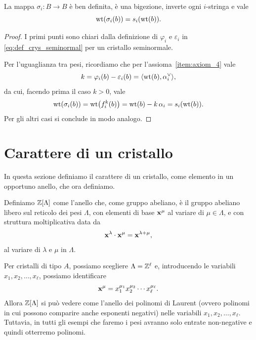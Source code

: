 \begin{proposition}
    \label{prop:sigma_involuzione}
    La mappa $\sigma_i \colon B \to B$ \`e ben definita, \`e una bigezione, inverte
    ogni $i$-stringa e vale 
    \[
        \operatorname{wt}(\sigma_i(b)) = s_i (\operatorname{wt}(b)).
    \]
\end{proposition}

\begin{proof}
    I primi punti sono chiari dalla definizione di $\varphi_i$ e $\varepsilon_i$
    in \eqref{eq:def_crys_seminormal} per un cristallo seminormale.

    Per l'uguaglianza tra pesi, ricordiamo che per l'assioma~\ref{item:axiom_4}
    vale
    \[
        k =  \varphi_i(b) - \varepsilon_i(b) = \langle \operatorname{wt}(b) , \alpha_i^\vee \rangle,
    \]
    da cui, facendo prima il caso $k>0$, vale
    \[
        \operatorname{wt}(\sigma_i(b)) 
        = \operatorname{wt}\bigl(f_i^k (b)\bigr)
        = \operatorname{wt}(b) - k \, \alpha_i
        = s_i(\operatorname{wt}(b)).
    \]
    Per gli altri casi si conclude in modo analogo.
\end{proof}

\section{Carattere di un cristallo}

In questa sezione definiamo il carattere di un cristallo, come elemento in un opportuno
anello, che ora definiamo.

\begin{definition}
    Definiamo $\mathbb{Z}[ \Lambda ]$ come l'anello che,
    come gruppo abeliano, \`e il gruppo abeliano libero sul reticolo
    dei pesi $\Lambda$, con elementi di base $\mathbf{x}^\mu$ al variare di $\mu \in \Lambda$,
    e con struttura moltiplicativa data da
    \[
        \mathbf{x}^\lambda \cdot \mathbf{x}^\mu = \mathbf{x}^{\lambda+\mu},
    \]
    al variare di $\lambda$ e $\mu$ in $\Lambda$.

\end{definition}

Per cristalli di tipo $A$, possiamo scegliere $\Lambda = \mathbb{Z}^\ell$ e, introducendo le
variabili $x_1, x_2, \dots, x_\ell$, possiamo identificare
\[
    \mathbf{x}^\mu = x_1^{\mu_1} x_2^{\mu_2} \cdots x_\ell^{\mu_\ell}.
\]
Allora $\mathbb{Z}[\Lambda]$ si pu\`o vedere come l'anello dei polinomi di Laurent (ovvero
polinomi in cui possono comparire anche esponenti negativi) nelle variabili 
$x_1, x_2, \dots, x_\ell$.
Tuttavia, in tutti gli esempi che faremo i pesi avranno solo entrate non-negative e quindi
otterremo polinomi.

